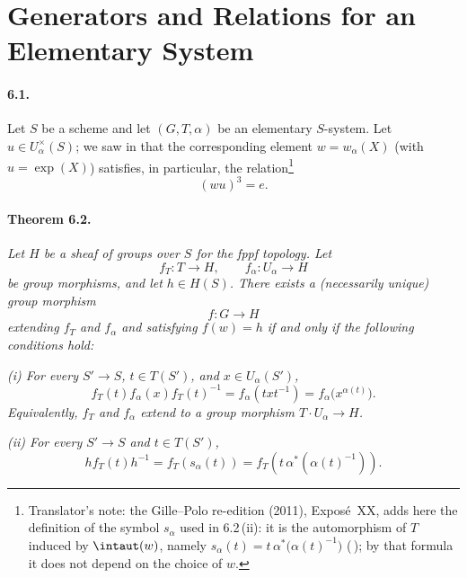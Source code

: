 \section{Generators and Relations for an Elementary System}

\paragraph{\textbf{6.1.}}
Let \(S\) be a scheme and let \((G,T,\alpha)\) be an elementary
\(S\)-system.  Let \(u\in U_\alpha^\times(S)\); we saw in
 that the corresponding element \(w=w_\alpha(X)\)
\textup{(}with \(u=\exp(X)\)\textup{)} satisfies, in particular, the relation\footnote{Translator's note: the Gille--Polo re-edition (2011), Exposé~XX, adds here the definition of the symbol
\(s_\alpha\) used in 6.2\,(ii): it is the automorphism of \(T\) induced by \(\intaut(w)\), namely
\(s_\alpha(t)=t\,\alpha^\ast\bigl(\alpha(t)^{-1}\bigr)\)
\textup{(\,)}; by that formula it does not
depend on the choice of \(w\).}
\[
 (wu)^3=e.
\]

\paragraph{\textbf{Theorem 6.2.}}
\emph{Let \(H\) be a sheaf of groups over \(S\) for the fppf
topology.  Let}
\[
 f_T\colon T\longrightarrow H,
 \qquad
 f_\alpha\colon U_\alpha\longrightarrow H
\]
\emph{be group morphisms, and let \(h\in H(S)\).  There exists a
\textup{(necessarily unique)} group morphism}
\[
 f\colon G\longrightarrow H
\]
\emph{extending \(f_T\) and \(f_\alpha\) and satisfying \(f(w)=h\)
if and only if the following conditions hold:}

\emph{\textup{(i)} For every \(S'\to S\),
\(t\in T(S')\), and \(x\in U_\alpha(S')\),}
\begin{equation}
\tag{1}\label{sga3:xx:theorem:6-2:equation:1}
 f_T(t)f_\alpha(x)f_T(t)^{-1}
 =f_\alpha(txt^{-1})
 =f_\alpha\bigl(x^{\alpha(t)}\bigr).
\end{equation}
\emph{Equivalently, \(f_T\) and \(f_\alpha\) extend to a group
morphism \(T\cdot U_\alpha\to H\).}

\emph{\textup{(ii)} For every \(S'\to S\) and \(t\in T(S')\),}
\begin{equation}
\tag{2}\label{sga3:xx:theorem:6-2:equation:2}
 h f_T(t)h^{-1}
 =f_T(s_\alpha(t))
 =f_T\!\left(t\,\alpha^\ast(\alpha(t)^{-1})\right).
\end{equation}

